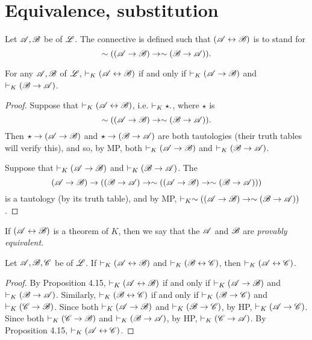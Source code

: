 \section{Equivalence, substitution}

Let \(\cua, \cub\) be \wfs{} of \(\cul\). The connective is defined such that \((\cua \lra \cub)\) is to stand for
  \[\sim((\cua \ra \cub) \ra \sim(\cub \ra \cua)).\]

\setcounter{definition}{14}
\begin{proposition}
  For any \wfs{} \(\cua, \cub\) of \(\cul\), \(\ded{K} (\cua \lra \cub)\) if and only if \(\ded{K} (\cua \ra \cub)\) and \(\ded{K} (\cub \ra \cua)\).

  \begin{proof}
    \Ra{} Suppose that \(\ded{K} (\cua \lra \cub)\), i.e. \(\ded{K} \star.\), where \(\star\) is
        \[\sim((\cua \ra \cub) \ra \sim(\cub \ra \cua)).\]
      Then \(\star \ra (\cua \ra \cub)\) and \(\star \ra (\cub \ra \cua)\) are both tautologies (their truth tables will verify this), and so, by MP, both \(\ded{K} (\cua \ra \cub)\) and \(\ded{K} (\cub \ra \cua)\).

    \La{} Suppose that \(\ded{K} (\cua \ra \cub)\) and \(\ded{K} (\cub \ra \cua)\). The \wf{}
        \[(\cua \ra \cub) \ra ((\cub \ra \cua) \ra \sim((\cua \ra \cub) \ra \sim(\cub \ra \cua)))\]
      is a tautology (by its truth table), and by MP, \(\ded{K} \sim((\cua \ra \cub) \ra \sim(\cub \ra \cua))\).
  \end{proof}
\end{proposition}

\begin{definition}
  If \((\cua \lra \cub)\) is a theorem of \(K\), then we say that the \wfs{} \(\cua\) and \(\cub\) are \textit{provably equivalent}.
\end{definition}

\begin{corollary}
  Let \(\cua, \cub, \cuc\) be \wfs{} of \(\cul\). If \(\ded{K} (\cua \lra \cub)\) and \(\ded{K} (\cub \lra \cuc)\), then \(\ded{K} (\cua \lra \cuc)\).

  \begin{proof}
    By Proposition 4.15, \(\ded{K} (\cua \lra \cub)\) if and only if \(\ded{K} (\cua \ra \cub)\) and \(\ded{K} (\cub \ra \cua)\). Similarly, \(\ded{K} (\cub \lra \cuc)\) if and only if \(\ded{K} (\cub \ra \cuc)\) and \(\ded{K} (\cuc \ra \cub)\). Since both \(\ded{K} (\cua \ra \cub)\) and \(\ded{K} (\cub \ra \cuc)\), by HP, \(\ded{K} (\cua \ra \cuc)\). Since both \(\ded{K} (\cuc \ra \cub)\) and \(\ded{K} (\cub \ra \cua)\), by HP, \(\ded{K} (\cuc \ra \cua)\). By Proposition 4.15, \(\ded{K} (\cua \lra \cuc)\).
  \end{proof}
\end{corollary}

